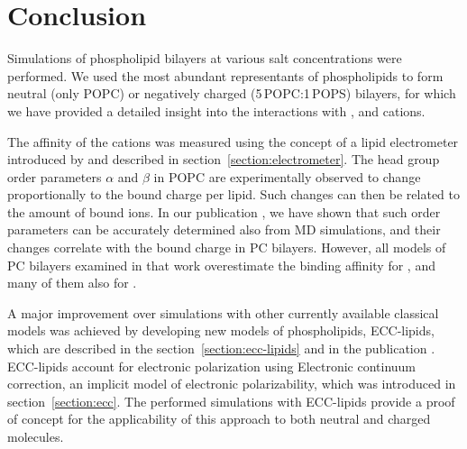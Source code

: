 \chapter*{Conclusion}

Simulations of phospholipid bilayers at various salt concentrations were performed. 
We used the most abundant representants of phospholipids
to form neutral (only POPC) or negatively charged (5\,POPC:1\,POPS) bilayers, 
for which we have provided a detailed insight 
into the interactions with 
,  and  cations. 

The affinity of the cations 
was measured using the concept of a lipid electrometer 
introduced by \citet{seelig87} 
and described in section~\ref{section:electrometer}.
The head group order parameters $\alpha$ and $\beta$ in POPC
are experimentally observed to change
proportionally to the bound charge per lipid. 
Such changes can then be related to the amount of bound ions.
In our publication \citep{catte16},
we have shown that such order parameters can be accurately determined also from MD simulations,
and their changes correlate with the bound charge in PC bilayers. 
However, all models of PC bilayers examined in that work
overestimate the binding affinity for , 
and many of them also for . 

A major improvement over simulations with other currently available classical models
was achieved by developing new models of phospholipids, 
ECC-lipids,
which are described in the section~\ref{section:ecc-lipids}
and in the publication \citep{melcr18}. 
ECC-lipids account for electronic polarization
using Electronic continuum correction,  
an implicit model of electronic polarizability, 
which was introduced in section~\ref{section:ecc}. 
The performed simulations with ECC-lipids 
provide a proof of concept for the applicability of this approach 
to both neutral and charged molecules. 

